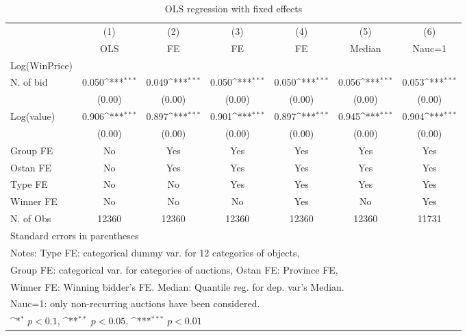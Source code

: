 {
\def\sym#1{\ifmmode^{#1}\else\(^{#1}\)\fi}
\begin{longtable}{l*{6}{c}}
\caption{OLS regression with fixed effects \label{reg1}}\\
\toprule\endfirsthead\midrule\endhead\midrule\endfoot\endlastfoot
                &\multicolumn{1}{c}{(1)}&\multicolumn{1}{c}{(2)}&\multicolumn{1}{c}{(3)}&\multicolumn{1}{c}{(4)}&\multicolumn{1}{c}{(5)}&\multicolumn{1}{c}{(6)}\\
                &\multicolumn{1}{c}{OLS}&\multicolumn{1}{c}{FE}&\multicolumn{1}{c}{FE}&\multicolumn{1}{c}{FE}&\multicolumn{1}{c}{Median}&\multicolumn{1}{c}{Nauc=1}\\
Log(WinPrice)   &                  &                  &                  &                  &                  &                  \\
\midrule
N. of bid       &    0.050\sym{***}&    0.049\sym{***}&    0.050\sym{***}&    0.050\sym{***}&    0.056\sym{***}&    0.053\sym{***}\\
                &   (0.00)         &   (0.00)         &   (0.00)         &   (0.00)         &   (0.00)         &   (0.00)         \\
Log(value)      &    0.906\sym{***}&    0.897\sym{***}&    0.901\sym{***}&    0.897\sym{***}&    0.945\sym{***}&    0.904\sym{***}\\
                &   (0.00)         &   (0.00)         &   (0.00)         &   (0.00)         &   (0.00)         &   (0.00)         \\
\midrule
Group FE        &       No         &      Yes         &      Yes         &      Yes         &      Yes         &      Yes         \\
Ostan FE        &       No         &      Yes         &      Yes         &      Yes         &      Yes         &      Yes         \\
Type FE         &       No         &       No         &      Yes         &      Yes         &      Yes         &      Yes         \\
Winner FE       &       No         &       No         &       No         &      Yes         &       No         &      Yes         \\
N. of Obs       &    12360         &    12360         &    12360         &    12360         &    12360         &    11731         \\
\bottomrule
\multicolumn{7}{l}{\footnotesize Standard errors in parentheses}\\
\multicolumn{7}{l}{\footnotesize Notes: Type FE: categorical dummy var. for 12 categories of objects,}\\
\multicolumn{7}{l}{\footnotesize Group FE: categorical var. for categories of auctions, Ostan FE: Province FE,}\\
\multicolumn{7}{l}{\footnotesize Winner FE: Winning bidder's FE. Median: Quantile reg. for dep. var's Median.}\\
\multicolumn{7}{l}{\footnotesize Nauc=1: only non-recurring auctions have been considered.}\\
\multicolumn{7}{l}{\footnotesize \sym{*} \(p<0.1\), \sym{**} \(p<0.05\), \sym{***} \(p<0.01\)}\\
\end{longtable}
}
